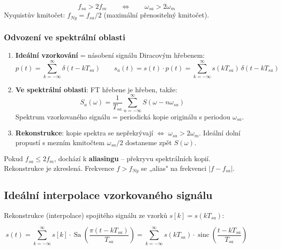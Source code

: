\documentclass[12pt,a4paper]{article}
\newcommand{\sinc}{\operatorname{sinc}}
\begin{document}
\begin{matBox}
\[
  f_{sa} > 2 f_m
  \qquad \Leftrightarrow \qquad
  \omega_{sa} > 2\omega_m
\]
Nyquistův kmitočet: $f_{Ny} = f_{sa}/2$ (maximální přenositelný kmitočet).
\end{matBox}

\subsubsection*{Odvození ve spektrální oblasti}

\begin{enumerate}
  \item \textbf{Ideální vzorkování} = násobení signálu Diracovým hřebenem:
    \[
      p(t) = \sum_{k=-\infty}^{\infty}\delta(t - kT_{sa})
      \qquad
      s_a(t) = s(t)\cdot p(t) = \sum_{k=-\infty}^{\infty} s(kT_{sa})\,\delta(t-kT_{sa})
    \]
  \item \textbf{Ve spektrální oblasti}: FT hřebene je hřeben, takže:
    \[
      S_a(\omega) = \frac{1}{T_{sa}}\sum_{n=-\infty}^{\infty} S(\omega - n\omega_{sa})
    \]
    Spektrum vzorkovaného signálu = periodická kopie originálu s periodou $\omega_{sa}$.
  \item \textbf{Rekonstrukce}: kopie spektra se nepřekrývají $\Leftrightarrow$ $\omega_{sa} > 2\omega_m$. Ideální dolní propustí s mezním kmitočtem $\omega_{sa}/2$ dostaneme zpět $S(\omega)$.
\end{enumerate}

\begin{noteBox}[Aliasing]
Pokud $f_{sa} \leq 2f_m$, dochází k \textbf{aliasingu} – překryvu spektrálních kopií. Rekonstrukce je zkreslená. Frekvence $f > f_{Ny}$ se „alias" na frekvenci $|f - f_{sa}|$.
\end{noteBox}

\begin{hvezdBox}
\subsection*{Ideální interpolace vzorkovaného signálu}
\end{hvezdBox}

Rekonstrukce (interpolace) spojitého signálu ze vzorků $s[k] = s(kT_{sa})$:

\begin{matBox}
\[
  s(t) = \sum_{k=-\infty}^{\infty} s[k]\cdot\operatorname{Sa}\!\left(\frac{\pi(t-kT_{sa})}{T_{sa}}\right)
       = \sum_{k=-\infty}^{\infty} s(kT_{sa})\cdot\sinc\!\left(\frac{t-kT_{sa}}{T_{sa}}\right)
\]
\end{matBox}
\end{document}
